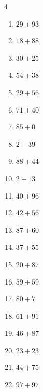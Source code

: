 \begin{multicols}{4}
\begin{enumerate}
  \item $29+93$
        \phantom{$=122$}

  \item $18+88$
        \phantom{$=106$}

  \item $30+25$
        \phantom{$=55$}

  \item $54+38$
        \phantom{$=92$}

  \item $29+56$
        \phantom{$=85$}

  \item $71+40$
        \phantom{$=111$}

  \item $85+0$
        \phantom{$=85$}

  \item $2+39$
        \phantom{$=41$}

  \item $88+44$
        \phantom{$=132$}

  \item $2+13$
        \phantom{$=15$}

  \item $40+96$
        \phantom{$=136$}

  \item $42+56$
        \phantom{$=98$}

  \item $87+60$
        \phantom{$=147$}

  \item $37+55$
        \phantom{$=92$}

  \item $20+87$
        \phantom{$=107$}

  \item $59+59$
        \phantom{$=118$}

  \item $80+7$
        \phantom{$=87$}

  \item $61+91$
        \phantom{$=152$}

  \item $46+87$
        \phantom{$=133$}

  \item $23+23$
        \phantom{$=46$}

  \item $44+75$
        \phantom{$=119$}

  \item $97+97$
        \phantom{$=194$}


\end{enumerate}
\end{multicols}
